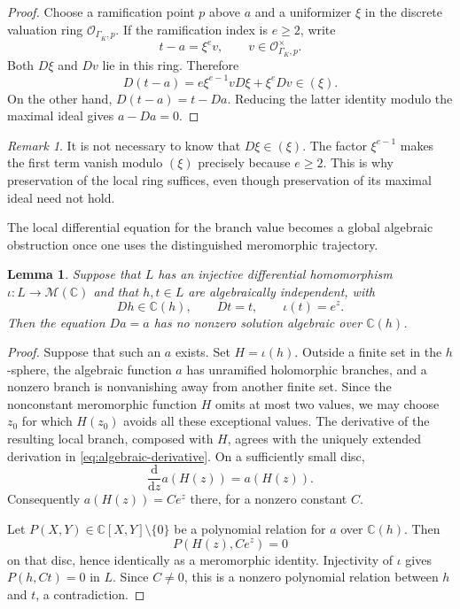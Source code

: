 \documentclass[11pt,reqno]{amsart}
\numberwithin{equation}{section}
\newtheorem{lemma}[theorem]{Lemma}
\theoremstyle{definition}
\theoremstyle{remark}
\newtheorem{remark}[theorem]{Remark}
\newcommand{\C}{\mathbb C}
\newcommand{\OO}{\mathcal O}
\newcommand{\MM}{\mathcal M}
\begin{document}
\begin{proof}
Choose a ramification point $p$ above $a$ and a uniformizer $\xi$ in
the discrete valuation ring $\OO_{\Gamma_{\overline K},p}$. If the
ramification index is $e\geq2$, write
\begin{equation}
 t-a=\xi^e v,
 \qquad v\in\OO_{\Gamma_{\overline K},p}^{\times}.
 \label{eq:local-ramification}
\end{equation}
Both $D\xi$ and $Dv$ lie in this ring. Therefore
\[
 D(t-a)=e\xi^{e-1}vD\xi+\xi^eDv\in(\xi).
\]
On the other hand, $D(t-a)=t-Da$. Reducing the latter identity modulo
the maximal ideal gives $a-Da=0$.
\end{proof}

\begin{remark}
It is not necessary to know that $D\xi\in(\xi)$. The factor
$\xi^{e-1}$ makes the first term vanish modulo $(\xi)$ precisely
because $e\geq2$. This is why preservation of the local ring suffices,
even though preservation of its maximal ideal need not hold.
\end{remark}

The local differential equation for the branch value becomes a global
algebraic obstruction once one uses the distinguished meromorphic
trajectory.

\begin{lemma}
\label{lem:no-finite-branch}
Suppose that $L$ has an injective differential homomorphism
$\iota:L\to\MM(\C)$ and that $h,t\in L$ are algebraically
independent, with
\[
 Dh\in\C(h),\qquad Dt=t,\qquad\iota(t)=e^z.
\]
Then the equation $Da=a$ has no nonzero solution algebraic over
$\C(h)$.
\end{lemma}

\begin{proof}
Suppose that such an $a$ exists. Set $H=\iota(h)$. Outside a finite set
in the $h$-sphere, the algebraic function $a$ has unramified
holomorphic branches, and a nonzero branch is nonvanishing away from
another finite set. Since the nonconstant meromorphic function $H$
omits at most two values, we may choose $z_0$ for which $H(z_0)$ avoids
all these exceptional values. The derivative of the resulting local
branch, composed with $H$, agrees with the uniquely extended derivation in
\eqref{eq:algebraic-derivative}. On a sufficiently small disc,
\[
 \frac{\mathrm d}{\mathrm dz}a(H(z))=a(H(z)).
\]
Consequently $a(H(z))=Ce^z$ there, for a nonzero constant $C$.

Let $P(X,Y)\in\C[X,Y]\setminus\{0\}$ be a polynomial relation for
$a$ over $\C(h)$. Then
\[
 P(H(z),Ce^z)=0
\]
on that disc, hence identically as a meromorphic identity. Injectivity
of $\iota$ gives $P(h,Ct)=0$ in $L$. Since $C\ne0$, this is a
nonzero polynomial relation between $h$ and $t$, a contradiction.
\end{proof}
\end{document}
